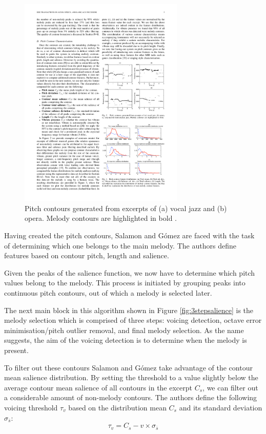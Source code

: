 \begin{figure}[h!]
  \centering
    \includegraphics[width=0.7\textwidth]{Figures/pitchcontour}
      \caption{Pitch contours generated from excerpts of (a) vocal jazz and (b) opera. Melody contours are highlighted in bold \cite{salamon}.}
\label{fig:pitchcontours}
\end{figure}

Having created the pitch contours, Salamon and G\'{o}mez are faced with the task of determining which one belongs to the main melody. The authors define features based on contour pitch, length and salience.

Given the peaks of the salience function, we now have to determine which pitch values belong to the melody. This process is initiated by grouping peaks into continuous pitch contours, out of which a melody is selected later. 

The next main block in this algorithm shown in Figure \ref{fig:3stepsalience} is the melody selection which is comprised of three steps: voicing detection, octave error minimisation/pitch outlier removal, and final melody selection.
As the name suggests, the aim of the voicing detection is to determine when the melody is present.


To filter out these contours Salamon and G\'{o}mez take advantage of the contour mean salience distribution.
By setting the threshold to a value slightly below the average contour mean salience of all contours in the excerpt $C_{s}$, we can filter out a considerable amount of non-melody contours. The authors define the following voicing threshold $\tau_{v}$ based on the distribution mean $C_{s}$ and its standard deviation $\sigma_{\overline{s}}$:
\begin{equation}
\tau_{v} = C_{s} - v \times \sigma_{\overline{s}}
\end{equation}

